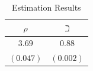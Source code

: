   \begin{table}[h]
    \caption{Estimation Results}\label{tab:EstResults}
    \center
    \begin{tabular}{cc}
      \hline
      $\rho $ & $\beth$\\
      \hline
      $3.69$ & $0.88$\\
      $(0.047)$ & $(0.002)$\\
      \hline
    \end{tabular}
  \end{table}
